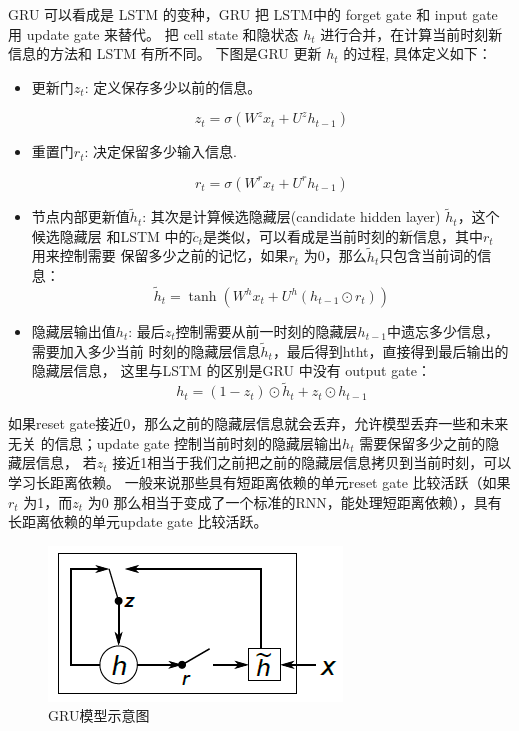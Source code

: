 \documentclass[12pt,a4paper]{article}
\begin{document}
GRU 可以看成是 LSTM 的变种，GRU 把 LSTM中的 forget gate 和 input gate 用 update gate 来替代。 把 cell state 和隐状态 $h_t$ 进行合并，在计算当前时刻新信息的方法和 LSTM 有所不同。 下图是GRU 更新 $h_t$ 的过程\cite{DBLP:journals/corr/Pezeshki15}, 具体定义如下：
\begin{itemize}
\item 更新门$z_t$: 定义保存多少以前的信息。

\[z_t = \sigma ( W^z x_t+ U^z h_{t-1}  )\]

\item 重置门$r_t$: 决定保留多少输入信息.

\[r_t = \sigma(W^r x_t  + U^r h_{t-1}  )\]

\item 节点内部更新值$\tilde h_t $: 其次是计算候选隐藏层(candidate hidden layer) $\tilde h_t$，这个候选隐藏层 和LSTM 中的$\tilde c_t$是类似，可以看成是当前时刻的新信息，其中$r_t$ 用来控制需要 保留多少之前的记忆，如果$r_t$ 为0，那么$\tilde h_t$只包含当前词的信息：
 \[\tilde h_t  = \tanh (W^h x_t  + U^h(h_{t-1} \odot r_t) )\]

\item 隐藏层输出值$h_t$: 最后$z_t$控制需要从前一时刻的隐藏层$h_{t−1}$中遗忘多少信息，需要加入多少当前 时刻的隐藏层信息$\tilde h_t$，最后得到htht，直接得到最后输出的隐藏层信息， 这里与LSTM 的区别是GRU 中没有 output gate：
\[h_t = (1-z_t)\odot \tilde h_t  + z_t \odot h_{t-1}\]
\end{itemize}
如果reset gate接近0，那么之前的隐藏层信息就会丢弃，允许模型丢弃一些和未来无关 的信息；update gate 控制当前时刻的隐藏层输出$h_t$ 需要保留多少之前的隐藏层信息， 若$z_t$ 接近1相当于我们之前把之前的隐藏层信息拷贝到当前时刻，可以学习长距离依赖。 一般来说那些具有短距离依赖的单元reset gate 比较活跃（如果$r_t$ 为1，而$z_t$ 为$0$ 那么相当于变成了一个标准的RNN，能处理短距离依赖），具有长距离依赖的单元update gate 比较活跃。

\begin{figure}
  \centering
  \includegraphics[width=0.6\linewidth]{./figures/gru.png}
  \caption{GRU模型示意图}\label{fig:gru}
\end{figure}
\end{document}
